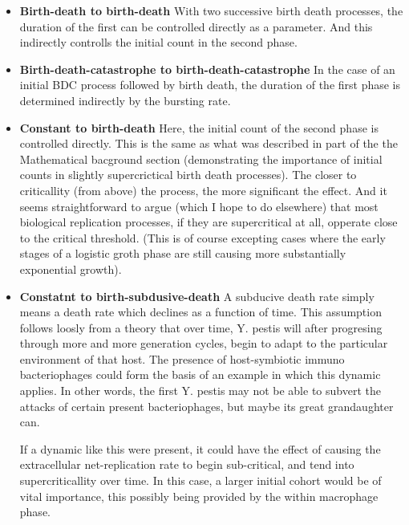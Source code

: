\begin{itemize}
\item \textbf{Birth-death to birth-death}
With two successive birth death processes, the duration of the first can be controlled directly as a parameter.  And this indirectly controlls the initial count in the second phase.


\item \textbf{Birth-death-catastrophe to birth-death-catastrophe}
In the case of an initial BDC process followed by birth death, the duration of the first phase is determined indirectly by the bursting rate. 

\item \textbf{Constant to birth-death}
Here,  the initial count of the second phase is controlled directly. This is the same as what was described in part of the the Mathematical bacground section (demonstrating the importance of initial counts in slightly supercrictical birth death processes).  The closer to criticallity (from above) the process, the more significant the effect.  And it seems straightforward to argue (which I hope to do elsewhere) that most biological replication processes,  if they are supercritical at all, opperate close to the critical threshold. (This is of course excepting cases where the early stages of a logistic groth phase are still causing more substantially exponential growth). 



\item \textbf{Constatnt to birth-subdusive-death}  A subducive death rate simply means a death rate which declines as a function of time.  This assumption follows loosly from a theory that over time, Y. pestis will after progresing through more and more generation cycles, begin to adapt to the particular environment of that host.  The presence of host-symbiotic immuno bacteriophages could form the basis of an example in which this dynamic applies.  In other words, the first Y. pestis may not be able to subvert the attacks of certain present bacteriophages, but maybe its great grandaughter can.  \par 
If a dynamic like this were present, it could have the effect of causing the extracellular net-replication rate to begin sub-critical, and tend into supercriticallity over time. In this case, a larger initial cohort would be of vital importance,  this possibly being provided by the within macrophage phase. 
\end{itemize}






